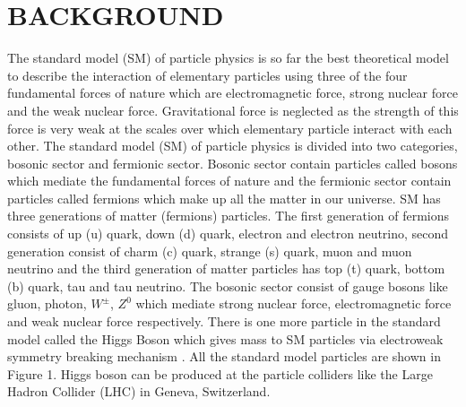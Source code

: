 \documentclass[final,3p]{CSP}
\begin{document}
\begin{adjustwidth}{1cm}{1cm}




\end{adjustwidth}

\hspace{2pt}
\vfill

\newpage
\section{BACKGROUND}


\onehalfspacing The standard model (SM) of particle physics is so far the best theoretical model to describe the interaction of elementary 
particles using three of the four fundamental forces of nature which are electromagnetic force, strong nuclear force and the 
weak nuclear force. Gravitational force is neglected as the strength of this force is very weak at the scales over which 
elementary particle interact with each other. The standard model (SM) of particle physics is divided into two categories, 
bosonic sector and fermionic sector. Bosonic sector contain particles called bosons which mediate the fundamental forces of 
nature and the fermionic sector contain particles called fermions which make up all the matter in our universe. SM has three 
generations of matter (fermions) particles. The first generation of fermions consists of up (u) quark, down (d) quark, electron 
and electron neutrino, second generation consist of charm (c) quark, strange (s) quark, muon and muon neutrino and the third 
generation of matter particles has top (t) quark, bottom (b) quark, tau and tau neutrino. The bosonic sector consist of gauge 
bosons like gluon, photon, $W^{\pm}$, $Z^0$ which mediate strong nuclear force, electromagnetic force and weak nuclear force respectively. There is one more particle in the standard model called the Higgs Boson which gives mass to SM particles via electroweak symmetry breaking mechanism \cite{Chatrchyan:2012xdj}. All the standard model particles are shown in Figure 1. Higgs boson can be produced at the particle colliders like the Large Hadron Collider (LHC) in Geneva, Switzerland.
\end{document}

